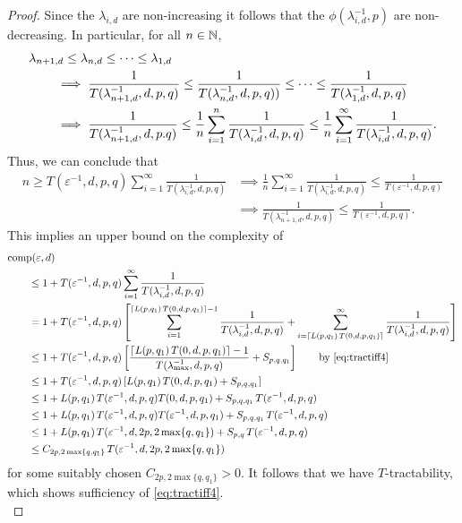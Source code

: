 \documentclass[11pt,a4paper]{article}
\begin{document}
\begin{proof}
Since the $\lambda_{i,d}$ are non-increasing it follows that the $\phi(\lambda_{i, d}^{-1},p)$ are non-decreasing.
In particular, for all $n \in \mathbb{N}$,
\begin{align*}
    \MoveEqLeft{\lambda_{n+1,d} \le \lambda_{n,d} \le \cdots \le \lambda_{1,d}} \\
    & \implies \frac{1}{T(\lambda_{n+1, d}^{-1},d,p,q)} \le \frac{1}{T(\lambda_{n, d}^{-1},d,p,q))} \le \cdots \le \frac{1}{T(\lambda_{1, d}^{-1},d,p,q)} \\
    & \implies \frac{1}{T(\lambda_{n+1, d}^{-1},d,p.q)}
    \le \frac 1n \sum_{i=1}^n  \frac{1}{T(\lambda_{i, d}^{-1},d,p,q)}
    \le \frac 1n \sum_{i=1}^\infty  \frac{1}{T(\lambda_{i, d}^{-1},d,p,q)}.
\end{align*}
Thus, we can conclude that
\begin{align*}
    n \ge T(\varepsilon^{-1},d,p,q) \sum_{i=1}^\infty \frac{1}{T(\lambda_{i, d}^{-1},d,p,q)}
    & \implies
  \frac 1n \sum_{i=1}^\infty \frac{1}{T(\lambda_{i, d}^{-1},d,p,q)} \le  \frac{1}{T(\varepsilon^{-1},d,p,q)} \\
   & \implies   \frac{1}{T(\lambda_{n+1, d}^{-1},d,p,q)} \le \frac{1}{T(\varepsilon^{-1},d,p,q)}.
\end{align*}
This implies an upper bound on the complexity of
\begin{align*}
       \MoveEqLeft{\comp(\varepsilon,d)} \\
       &\le 1 + T(\varepsilon^{-1},d,p,q) \sum_{i=1}^\infty \frac{1}{T(\lambda_{i, d}^{-1},d,p,q)} \\
       & = 1 + T(\varepsilon^{-1},d,p,q) \left [ \sum_{i=1}^{\lceil L(p,q_1)\, T(0,d,p,q_1)\rceil -1} \frac{1}{T(\lambda_{i, d}^{-1},d,p,q)}
       + \sum_{i=\lceil L(p,q_1)\, T(0,d,p,q_1) \rceil}^\infty \frac{1}{T(\lambda_{i, d}^{-1},d,p,q)} \right ] \\
       & \le 1+ T(\varepsilon^{-1},d,p,q)\left[ \frac{\lceil L(p,q_1)\, T(0,d,p,q_1)\rceil-1}{T(\lambda_{\max}^{-1},d,p,q)} + S_{p,q,q_1}\right]
        \qquad \text{by \eqref{eq:tractiff4}} \\
       & \le 1+ T(\varepsilon^{-1},d,p,q)\left[L(p,q_1)\, T(0,d,p,q_1) + S_{p,q,q_1}\right]\\
       & \le 1+L(p,q_1)\,T(\varepsilon^{-1},d,p,q) T(0,d,p,q_1) + S_{p,q,q_1}\, T(\varepsilon^{-1},d,p,q)\\
       & \le 1+L(p,q_1)\,T(\varepsilon^{-1},d,p,q) T(\varepsilon^{-1},d,p,q_1) + S_{p,q,q_1}\, T(\varepsilon^{-1},d,p,q)\\
       & \le 1+L(p,q_1)\,T(\varepsilon^{-1},d,2p,2\max\{q,q_1\})  + S_{p,q}\, T(\varepsilon^{-1},d,p,q)  \\
       & \le C_{2p,2\max\{q,q_1\}} \,T(\varepsilon^{-1},d,2p,2\max\{q,q_1\})
\end{align*}
for some suitably chosen $C_{2p,2\max\{q,q_1\}}>0$. It follows that we have $T$-tractability, which shows sufficiency of \eqref{eq:tractiff4}. \\




\end{proof}
\end{document}
